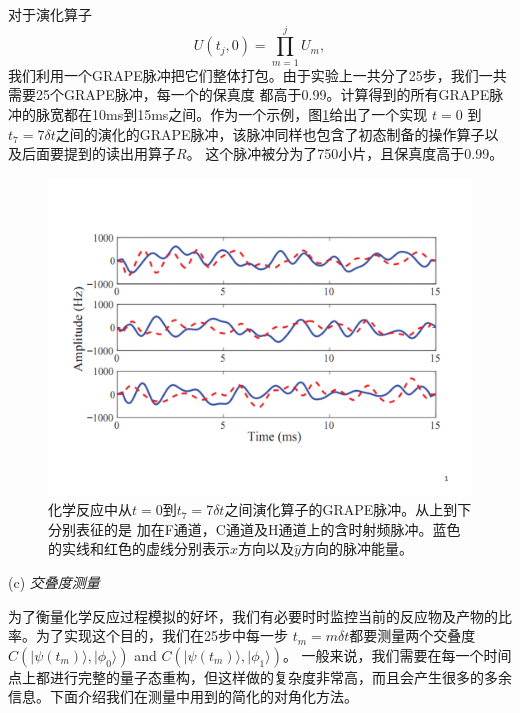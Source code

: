 对于演化算子
\begin{equation}
U(t_j, 0) = \prod_{m=1}^{j}U_m,
 \end{equation}
 我们利用一个GRAPE脉冲把它们整体打包。由于实验上一共分了25步，我们一共需要25个GRAPE脉冲，每一个的保真度
 都高于0.99。计算得到的所有GRAPE脉冲的脉宽都在10ms到15ms之间。作为一个示例，图\ref{nmrdymgrape}给出了一个实现
 $t=0$ 到$t_7=7\delta t$之间的演化的GRAPE脉冲，该脉冲同样也包含了初态制备的操作算子以及后面要提到的读出用算子$R$。
 这个脉冲被分为了750小片，且保真度高于0.99。

 \begin{figure}[htbp]
            \begin{center}
              \includegraphics[width= 0.8\columnwidth]{figures/nmrdymgrape.pdf}
              \caption{化学反应中从$t=0$到$t_7=7\delta t$之间演化算子的GRAPE脉冲。从上到下分别表征的是
              加在F通道，C通道及H通道上的含时射频脉冲。蓝色的实线和红色的虚线分别表示$\hat{x}$方向以及$\hat{y}$方向的脉冲能量。}\label{nmrdymgrape}
            \end{center}
 \end{figure}

  (c) \emph{交叠度测量}

 为了衡量化学反应过程模拟的好坏，我们有必要时时监控当前的反应物及产物的比率。为了实现这个目的，我们在25步中每一步
 $t_m=m\delta t$都要测量两个交叠度$C(| \psi({t_m}) \rangle,| \phi_{0} \rangle)$ and $C(| \psi(t_{m}) \rangle,| \phi_{1} \rangle)$。
 一般来说，我们需要在每一个时间点上都进行完整的量子态重构，但这样做的复杂度非常高，而且会产生很多的多余信息。下面介绍我们在测量中用到的简化的对角化方法。

